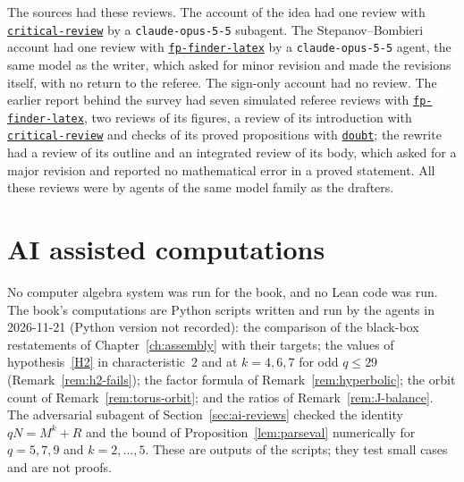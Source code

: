 \documentclass[11pt]{amsbook}
\theoremstyle{plain}
\theoremstyle{definition}
\theoremstyle{remark}
\numberwithin{equation}{section}
\numberwithin{figure}{chapter}
\numberwithin{table}{chapter}
\newcommand{\vtwoskillurl}{https://github.com/tdupu/%
agent-skills-public/blob/8d13efb5e66306aeae6e3b948bc463e7e2db1b65}
\newcommand{\vtwoskill}[1]{%
\href{\vtwoskillurl/skills/#1/SKILL.md}{\texttt{#1}}}
\begin{document}
The sources had these reviews. The account of the idea had one review
with \vtwoskill{critical-review} by a \texttt{claude-opus-5-5}
subagent. The Stepanov--Bombieri account had one review with
\vtwoskill{fp-finder-latex} by a \texttt{claude-opus-5-5} agent, the
same model as the writer, which asked for minor revision and made the
revisions itself, with no return to the referee. The sign-only account
had no review. The earlier report behind the survey had seven
simulated referee reviews with \vtwoskill{fp-finder-latex}, two
reviews of its figures, a review of its introduction with
\vtwoskill{critical-review} and checks of its proved propositions with
\vtwoskill{doubt}; the rewrite had a review of its outline and an
integrated review of its body, which asked for a major revision and
reported no mathematical error in a proved statement. All these
reviews were by agents of the same model family as the drafters.
\begin{figure}[tbp]
\centering

\end{figure}

\section{AI assisted computations}
\label{sec:ai-computations}
No computer algebra system was run for the book, and no Lean code was
run. The book's computations are Python scripts written and run by
the agents in 2026-11-21 (Python version not recorded): the comparison
of the black-box restatements of Chapter~\ref{ch:assembly} with their
targets; the values of hypothesis~\ref{H2} in characteristic~$2$ and
at $k=4,6,7$ for odd $q\le29$ (Remark~\ref{rem:h2-fails}); the factor
formula of Remark~\ref{rem:hyperbolic}; the orbit count of
Remark~\ref{rem:torus-orbit}; and the ratios of
Remark~\ref{rem:J-balance}. The adversarial subagent of
Section~\ref{sec:ai-reviews} checked the identity $qN=M^k+R$ and the
bound of
Proposition~\ref{lem:parseval} numerically for $q=5,7,9$ and
$k=2,\dots,5$. These are outputs of the scripts; they test small cases
and are not proofs.
\end{document}
